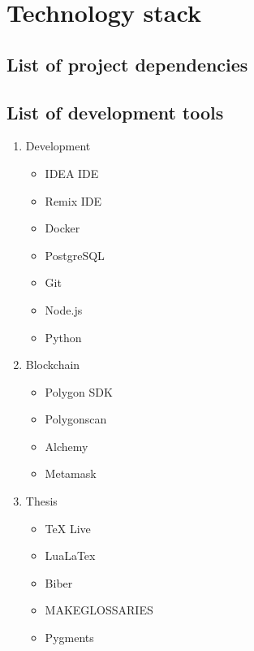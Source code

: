 \chapter{Technology stack}\label{ch:apx-technology-stack}

\section{List of project dependencies}\label{sec:list-of-project-dependencies}


\section{List of development tools}\label{sec:list-of-development-tools}

\begin{enumerate}
    \item Development
    \begin{itemize}
        \item IDEA IDE
        \item Remix IDE
        \item Docker
        \item PostgreSQL
        \item Git
        \item Node.js
        \item Python
    \end{itemize}
    \item Blockchain
    \begin{itemize}
        \item Polygon SDK
        \item Polygonscan
        \item Alchemy
        \item Metamask
    \end{itemize}
    \item Thesis
    \begin{itemize}
        \item TeX Live
        \item LuaLaTex
        \item Biber
        \item MAKEGLOSSARIES
        \item Pygments
    \end{itemize}
\end{enumerate}